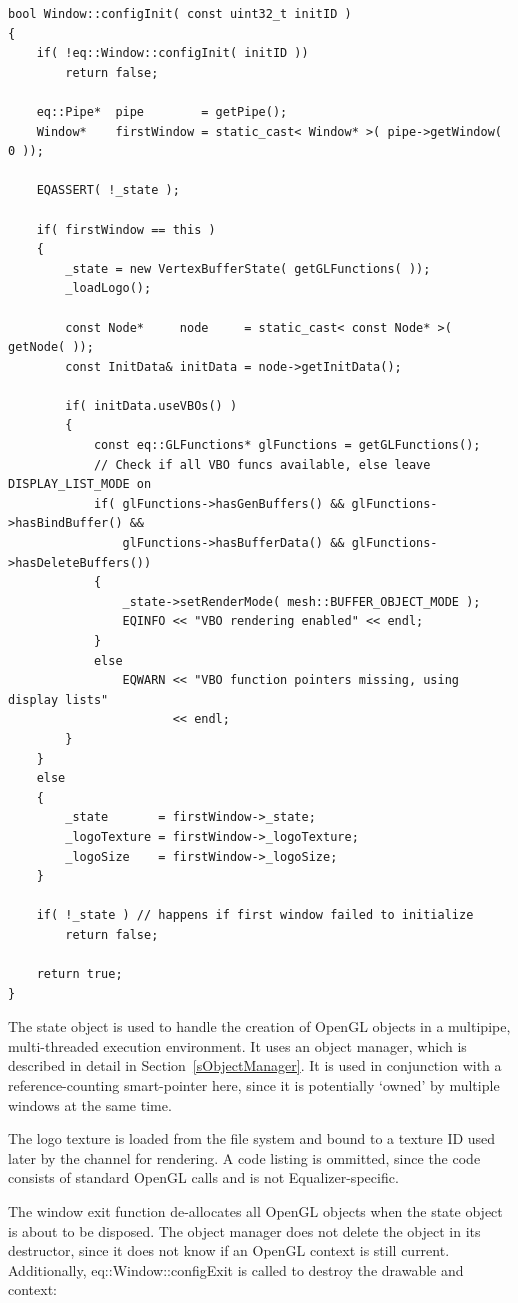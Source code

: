 \documentclass[10pt,a4]{scrartcl}
\newcommand{\sref}[1]{Section~\ref{#1}}
\begin{document}
{\footnotesize\begin{lstlisting}
bool Window::configInit( const uint32_t initID )
{
    if( !eq::Window::configInit( initID ))
        return false;

    eq::Pipe*  pipe        = getPipe();
    Window*    firstWindow = static_cast< Window* >( pipe->getWindow( 0 ));

    EQASSERT( !_state );

    if( firstWindow == this )
    {
        _state = new VertexBufferState( getGLFunctions( ));
        _loadLogo();

        const Node*     node     = static_cast< const Node* >( getNode( ));
        const InitData& initData = node->getInitData();

        if( initData.useVBOs() )
        {
            const eq::GLFunctions* glFunctions = getGLFunctions();
            // Check if all VBO funcs available, else leave DISPLAY_LIST_MODE on
            if( glFunctions->hasGenBuffers() && glFunctions->hasBindBuffer() &&
                glFunctions->hasBufferData() && glFunctions->hasDeleteBuffers())
            {
                _state->setRenderMode( mesh::BUFFER_OBJECT_MODE );
                EQINFO << "VBO rendering enabled" << endl;
            }
            else
                EQWARN << "VBO function pointers missing, using display lists" 
                       << endl;
        }
    }
    else
    {
        _state       = firstWindow->_state;
        _logoTexture = firstWindow->_logoTexture;
        _logoSize    = firstWindow->_logoSize;
    }

    if( !_state ) // happens if first window failed to initialize
        return false;
    
    return true;
}
\end{lstlisting}}%

The state object is used to handle the creation of OpenGL objects in a
multipipe, multi-threaded execution environment. It uses an object
manager, which is described in detail in \sref{sObjectManager}. It is
used in conjunction with a reference-counting smart-pointer here, since it is
potentially `owned' by multiple windows at the same time.

The logo texture is loaded from the file system and bound to a texture
ID used later by the channel for rendering. A code listing is ommitted,
since the code consists of standard OpenGL calls and is not
Equalizer-specific.

The window exit function de-allocates all OpenGL objects when the state
object is about to be disposed. The object manager does not delete the
object in its destructor, since it does not know if an OpenGL context is
still current. Additionally, \textsf{eq::Window::configExit} is called
to destroy the drawable and context:
\end{document}
